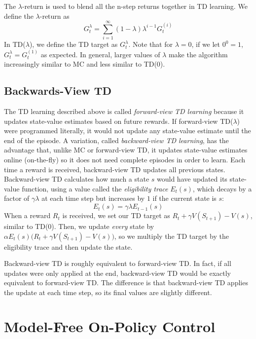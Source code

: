 \documentclass{article}
\newcommand{\ita}{\textit}
\begin{document}
The $\lambda$-return is used to blend all the n-step returns together in TD learning. We define the $\lambda$-return as
\begin{equation}\label{eq:td_lambda_return}
G^\lambda_t = \sum_{i=1}^\infty (1-\lambda)\lambda^{i-1}G^{(i)}_t
\end{equation}
In TD($\lambda$), we define the TD target as $G^\lambda_t$. Note that for $\lambda = 0$, if we let $0^0 = 1$, $G^\lambda_t = G^{(1)}_t$ as expected. In general, larger values of $\lambda$ make the algorithm increasingly similar to MC and less similar to TD(0).

\subsection{Backwards-View TD}

The TD learning described above is called \ita{forward-view TD learning} because it updates state-value estimates based on future rewards. If forward-view TD($\lambda$) were programmed literally, it would not update any state-value estimate until the end of the episode. A variation, called \ita{backward-view TD learning}, has the advantage that, unlike MC or forward-view TD, it updates state-value estimates online (on-the-fly) so it does not need complete episodes in order to learn. Each time a reward is received, backward-view TD updates all previous states. Backward-view TD calculates how much a state $s$ would have updated its state-value function, using a value called the \ita{eligibility trace} $E_t(s)$, which decays by a factor of $\gamma\lambda$ at each time step but increases by $1$ if the current state is $s$:
\begin{equation}\label{eq:eligibility_trace_update}
E_t(s) = \gamma\lambda E_{t-1}(s)
\end{equation}
When a reward $R_t$ is received, we set our TD target as $R_t + \gamma V(S_{t+1}) - V(s)$, similar to TD(0). Then, we update \ita{every} state by $\alpha E_t(s)\bigg(R_t + \gamma V(S_{t+1}) - V(s)\bigg)$, so we multiply the TD target by the eligibility trace and then update the state.

Backward-view TD is roughly equivalent to forward-view TD. In fact, if all updates were only applied at the end, backward-view TD would be exactly equivalent to forward-view TD. The difference is that backward-view TD applies the update at each time step, so its final values are slightly different.

\section{Model-Free On-Policy Control}
\end{document}
